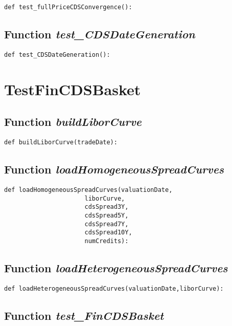 \documentclass[twoside,11pt]{book}
\begin{document}
\begin{lstlisting}
def test_fullPriceCDSConvergence():
\end{lstlisting}

\subsection{Function {\it test\_CDSDateGeneration}}


\begin{lstlisting}
def test_CDSDateGeneration():
\end{lstlisting}


\newpage
\section{TestFinCDSBasket}

\subsection{Function {\it buildLiborCurve}}


\begin{lstlisting}
def buildLiborCurve(tradeDate):
\end{lstlisting}

\subsection{Function {\it loadHomogeneousSpreadCurves}}


\begin{lstlisting}
def loadHomogeneousSpreadCurves(valuationDate,
                      liborCurve,
                      cdsSpread3Y,
                      cdsSpread5Y,
                      cdsSpread7Y,
                      cdsSpread10Y,
                      numCredits):
\end{lstlisting}

\subsection{Function {\it loadHeterogeneousSpreadCurves}}


\begin{lstlisting}
def loadHeterogeneousSpreadCurves(valuationDate,liborCurve):
\end{lstlisting}

\subsection{Function {\it test\_FinCDSBasket}}
\end{document}
